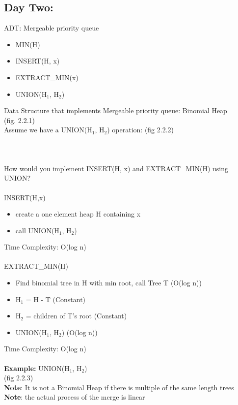 \documentclass{article}
\begin{document}
		 \subsection{Day Two: }
		 ADT: Mergeable priority queue\\
		 \begin{itemize}
		 	\item MIN(H)
		 	\item INSERT(H, x)
		 	\item EXTRACT\_MIN(x)
		 	\item UNION(H$_1$, H$_2$)\\
		 \end{itemize}
		Data Structure that implements Mergeable priority queue: Binomial Heap\\
		(fig. 2.2.1)\\
		Assume we have a UNION(H$_1$, H$_2$) operation: (fig 2.2.2)\\\\\\\\
		How would you implement INSERT(H, x) and EXTRACT\_MIN(H) using UNION?\\\\
		INSERT(H,x)
		\begin{itemize}
			\item create a one element heap H containing x
			\item call UNION(H$_1$, H$_2$)
		\end{itemize}
		Time Complexity: O(log n)\\\\
		EXTRACT\_MIN(H)
		\begin{itemize}
			\item Find binomial tree in H with min root, call Tree T (O(log n))
			\item H$_1$ = H - T (Constant)
			\item H$_2$ = children of T's root (Constant)
			\item UNION(H$_1$, H$_2$) (O(log n))
		\end{itemize}
		Time Complexity: O(log n)\\\\
		\textbf{Example: } UNION(H$_1$, H$_2$)\\
		(fig 2.2.3)\\
		\textbf{Note}: It is not a Binomial Heap if there is multiple of the same length trees\\
		\textbf{Note}: the actual process of the merge is linear\\
\end{document}
